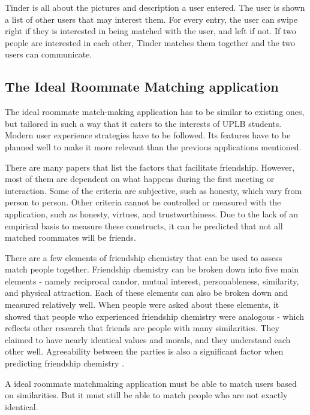 \documentclass[journal]{IEEEtran}
\begin{document}
        Tinder is all about the pictures and description a user entered. The user is shown a list of other users that may
        interest them. For every entry, the user can swipe right if they is interested in being matched with the user, and left
        if not. If two people are interested in each other, Tinder matches them together and the two users can communicate.

    \subsection{The Ideal Roommate Matching application}
    The ideal roommate match-making application has to be similar to existing ones, but tailored in such a way that it
    caters to the interests of UPLB students. Modern user experience strategies have to be followed. Its features have
    to be planned well to make it more relevant than the previous applications mentioned.

    There are many papers that list the factors that facilitate friendship. However, most of them are dependent on what
    happens during the first meeting or interaction. Some of the criteria are subjective, such as honesty, which  vary
    from person to person. Other criteria cannot be controlled or measured with the application, such as honesty,
    virtues, and trustworthiness. Due to the lack of an empirical basis to measure these constructs, it can be predicted
    that not all matched roommates will be friends.

    There are a few elements of friendship chemistry that can be used to assess match people together. Friendship
    chemistry can be broken down into five main elements - namely reciprocal candor, mutual interest, personableness,
    similarity, and physical attraction\cite{f_chemistry}. Each of these elements can also be broken down and measured
    relatively well. When people were asked about these elements, it showed that people who experienced friendship
    chemistry were analogous\cite{f_chemistry} - which reflects other research that friends are people with many
    similarities\cite{similar}. They claimed to have nearly identical values and morals, and they understand each other
    well\cite{f_chemistry}. Agreeability between the parties is also a significant factor when predicting friendship
    chemistry \cite{f_chemistry}.

    A ideal roommate matchmaking application must be able to match users based on similarities. But it must still be
    able to match people who are not exactly identical.
\end{document}
